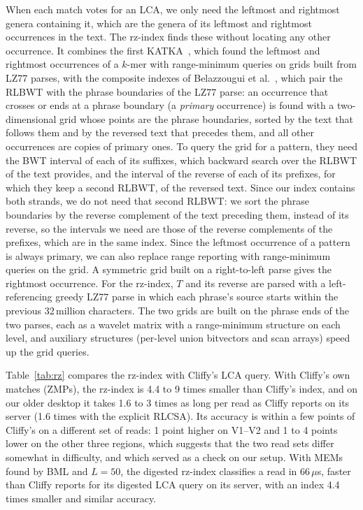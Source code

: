 When each match votes for an LCA, we only need the leftmost and rightmost genera containing it, which are the genera of its leftmost and rightmost occurrences in the text.
The rz-index finds these without locating any other occurrence.
It combines the first KATKA~\cite{GKL22}, which found the leftmost and rightmost occurrences of a $k$-mer with range-minimum queries on grids built from LZ77 parses, with the composite indexes of Belazzougui et al.~\cite{BelazzouguiEtAl2015,BelazzouguiEtAl2017}, which pair the RLBWT with the phrase boundaries of the LZ77 parse: an occurrence that crosses or ends at a phrase boundary (a \emph{primary} occurrence) is found with a two-dimensional grid whose points are the phrase boundaries, sorted by the text that follows them and by the reversed text that precedes them, and all other occurrences are copies of primary ones.
To query the grid for a pattern, they need the BWT interval of each of its suffixes, which backward search over the RLBWT of the text provides, and the interval of the reverse of each of its prefixes, for which they keep a second RLBWT, of the reversed text.
Since our index contains both strands, we do not need that second RLBWT: we sort the phrase boundaries by the reverse complement of the text preceding them, instead of its reverse, so the intervals we need are those of the reverse complements of the prefixes, which are in the same index.
Since the leftmost occurrence of a pattern is always primary, we can also replace range reporting with range-minimum queries on the grid.
A symmetric grid built on a right-to-left parse gives the rightmost occurrence.
For the rz-index, $T$ and its reverse are parsed with a left-referencing greedy LZ77 parse in which each phrase's source starts within the previous 32\,million characters.
The two grids are built on the phrase ends of the two parses, each as a wavelet matrix with a range-minimum structure on each level, and auxiliary structures (per-level union bitvectors and scan arrays) speed up the grid queries.

Table~\ref{tab:rz} compares the rz-index with Cliffy's LCA query.
With Cliffy's own matches (ZMPs), the rz-index is 4.4 to 9 times smaller than Cliffy's index, and on our older desktop it takes 1.6 to 3 times as long per read as Cliffy reports on its server (1.6 times with the explicit RLCSA).
Its accuracy is within a few points of Cliffy's on a different set of reads: 1 point higher on V1--V2 and 1 to 4 points lower on the other three regions, which suggests that the two read sets differ somewhat in difficulty, and which served as a check on our setup.
With MEMs found by BML and $L = 50$, the digested rz-index classifies a read in 66\,$\mu$s, faster than Cliffy reports for its digested LCA query on its server, with an index 4.4 times smaller and similar accuracy.

